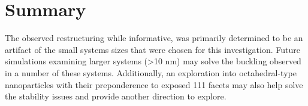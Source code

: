 \section{Summary}
The observed restructuring while informative, was primarily determined to be an
artifact of the small systems sizes that were chosen for this investigation.
Future simulations examining larger systems (>10 nm) may solve the buckling
observed in a number of these systems. Additionally, an exploration into
octahedral-type nanoparticles with their preponderence to exposed {111} facets
may also help solve the stability issues and provide another direction to explore.
